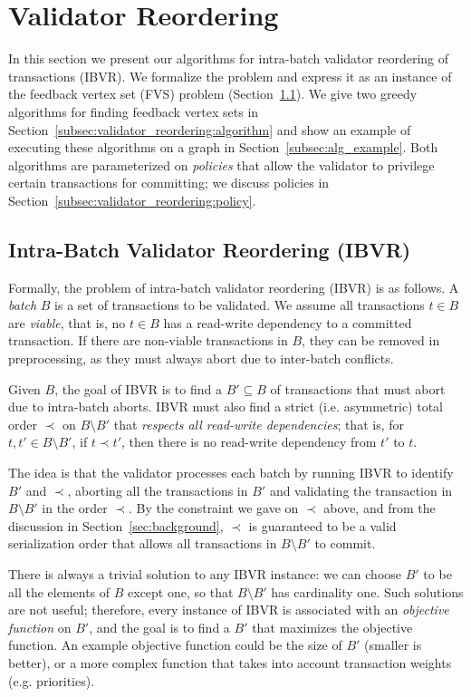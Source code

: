 \section{Validator Reordering}\label{sec:validator_reordering}

In this section we present our algorithms for intra-batch validator reordering of transactions (IBVR). We formalize the problem and express it as an instance of the feedback vertex set (FVS) problem (Section~\ref{sec:ibvr}). We give two greedy algorithms for finding feedback vertex sets in Section~\ref{subsec:validator_reordering:algorithm} and show an example of executing these algorithms on a graph in Section~\ref{subsec:alg_example}. Both algorithms are parameterized on \emph{policies} that allow the validator to privilege certain transactions for committing; we discuss policies in Section~\ref{subsec:validator_reordering:policy}.

\subsection{Intra-Batch Validator Reordering (IBVR)}\label{sec:ibvr}

Formally, the problem of intra-batch validator reordering (IBVR) is as follows. A \emph{batch} $B$ is a set of transactions to be validated. We assume all transactions $t \in B$ are \emph{viable}, that is, no $t \in B$ has a read-write dependency to a committed transaction. If there are non-viable transactions in $B$, they can be removed in preprocessing, as they must always abort due to inter-batch conflicts.

Given $B$, the goal of IBVR is to find a $B' \subseteq B$ of transactions that must abort due to intra-batch aborts. IBVR must also find a strict (i.e. asymmetric) total order $\prec$ on $B \setminus B'$ that \emph{respects all read-write dependencies}; that is, for $t,t'\in B \setminus B'$, if $t \prec t'$, then there is no read-write dependency from $t'$ to $t$.

The idea is that the validator processes each batch by running IBVR to identify $B'$ and $\prec$, aborting all the transactions in $B'$  and validating the transaction in $B \setminus B'$  in the order $\prec$. By the constraint we gave on $\prec$ above, and from the discussion in Section~\ref{sec:background}, $\prec$ is guaranteed to be a valid serialization order that allows all transactions in $B \setminus B'$  to commit.

There is always a trivial solution to any IBVR instance: we can choose $B'$ to be all the elements of $B$ except one, so that $B \setminus B'$ has cardinality one. Such solutions are not useful; therefore, every instance of IBVR is associated with an \emph{objective function} on $B'$, and the goal is to find a $B'$ that maximizes the objective function. An example objective function could be the size of $B'$ (smaller is better), or a more complex function that takes into account transaction weights (e.g. priorities).

